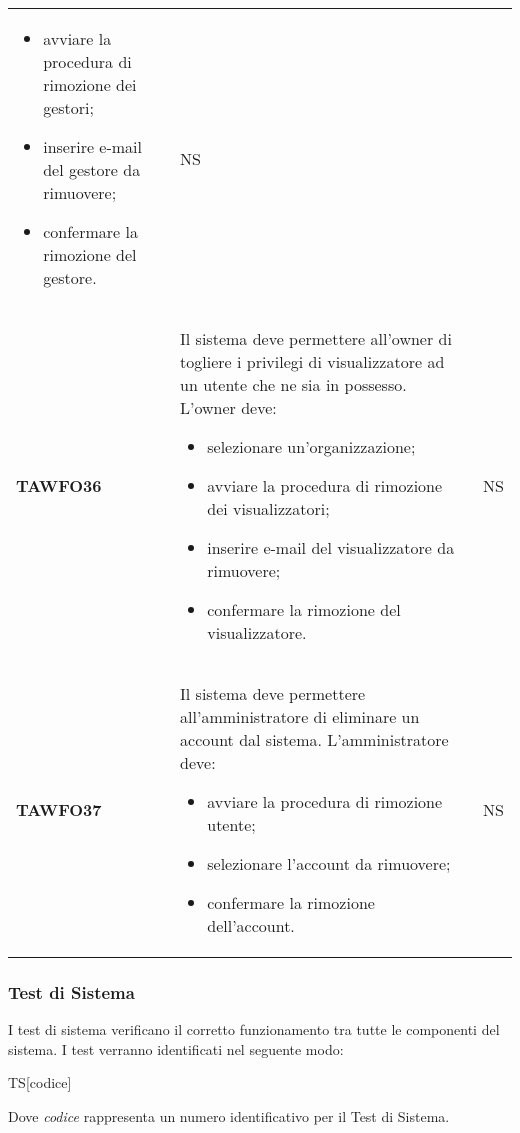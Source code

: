\documentclass[../piano-di-qualifica.tex]{subfiles}
\begin{document}
\begin{centering}
\begin{longtable}[H]{>{\centering\bfseries}m{3cm} >{}p{10cm} >{\centering\arraybackslash}m{3cm}}
\begin{itemize}
         \item avviare la procedura di rimozione dei gestori;
         \item inserire e-mail del gestore da rimuovere;
         \item confermare la rimozione del gestore.
        \end{itemize}
        & NS \\
        TAWFO36      & Il sistema deve permettere all’owner di togliere i privilegi di visualizzatore ad un utente che ne sia in possesso. \newline
        L'owner deve: 
        \begin{itemize} 
         \item selezionare un'organizzazione;
         \item avviare la procedura di rimozione dei visualizzatori;
         \item inserire e-mail del visualizzatore da rimuovere;
         \item confermare la rimozione del visualizzatore.
        \end{itemize}
        & NS \\
        TAWFO37      & Il sistema deve permettere all’amministratore di eliminare un account dal sistema. \newline
        L'amministratore deve:
        \begin{itemize}
         \item avviare la procedura di rimozione utente;
         \item selezionare l'account da rimuovere;
         \item confermare la rimozione dell'account.
        \end{itemize}
        & NS \\


      \end{longtable}
    \end{centering}
    \subsubsection{Test di Sistema}%
  \label{subs:sistema}
    I test di sistema verificano il corretto funzionamento tra tutte le componenti del sistema. I test verranno identificati nel seguente modo:
    \begin{center}
      TS[codice]
    \end{center}
    Dove \textit{codice} rappresenta un numero identificativo per il Test di Sistema.
\end{document}
